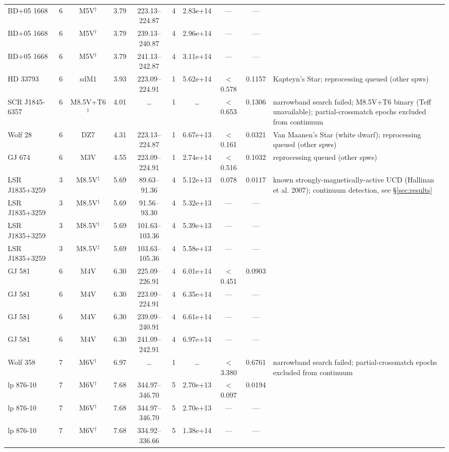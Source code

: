 \documentclass{openjournal}
\begin{document}
\begin{table}
\begin{tabularx}{\textwidth}{@{}l c c c c c c c c X@{}}
BD+05  1668 & 6 & M5V$^\dagger$ & 3.79 & 223.13--224.87 & 4 & 2.83e+14 & --- & --- &  \\
BD+05  1668 & 6 & M5V$^\dagger$ & 3.79 & 239.13--240.87 & 4 & 2.96e+14 & --- & --- &  \\
BD+05  1668 & 6 & M5V$^\dagger$ & 3.79 & 241.13--242.87 & 4 & 3.11e+14 & --- & --- &  \\
HD 33793 & 6 & sdM1 & 3.93 & 223.09--224.91 & 1 & 5.62e+14 & $<$0.578 & 0.1157 & Kapteyn's Star; reprocessing queued (other spws) \\
SCR J1845-6357 & 6 & M8.5V+T6$^\ddagger$ & 4.01 & \ldots & 1 & \ldots & $<$0.653 & 0.1306 & narrowband search failed; M8.5V+T6 binary (Teff unavailable); partial-crossmatch epochs excluded from continuum \\
Wolf   28 & 6 & DZ7 & 4.31 & 223.13--224.87 & 1 & 6.67e+13 & $<$0.161 & 0.0321 & Van Maanen's Star (white dwarf); reprocessing queued (other spws) \\
GJ 674 & 6 & M3V & 4.55 & 223.09--224.91 & 1 & 2.74e+14 & $<$0.516 & 0.1032 & reprocessing queued (other spws) \\
LSR J1835+3259 & 3 & M8.5V$^\ddagger$ & 5.69 & 89.63--91.36 & 4 & 5.12e+13 & 0.078 & 0.0117 & known strongly-magnetically-active UCD (Hallinan et al. 2007); continuum detection, see \S\ref{sec:results} \\
LSR J1835+3259 & 3 & M8.5V$^\ddagger$ & 5.69 & 91.56--93.30 & 4 & 5.32e+13 & --- & --- &  \\
LSR J1835+3259 & 3 & M8.5V$^\ddagger$ & 5.69 & 101.63--103.36 & 4 & 5.39e+13 & --- & --- &  \\
LSR J1835+3259 & 3 & M8.5V$^\ddagger$ & 5.69 & 103.63--105.36 & 4 & 5.58e+13 & --- & --- &  \\
GJ 581 & 6 & M4V & 6.30 & 225.09--226.91 & 4 & 6.01e+14 & $<$0.451 & 0.0903 &  \\
GJ 581 & 6 & M4V & 6.30 & 223.09--224.91 & 4 & 6.35e+14 & --- & --- &  \\
GJ 581 & 6 & M4V & 6.30 & 239.09--240.91 & 4 & 6.61e+14 & --- & --- &  \\
GJ 581 & 6 & M4V & 6.30 & 241.09--242.91 & 4 & 6.97e+14 & --- & --- &  \\
Wolf  358 & 7 & M6V$^\dagger$ & 6.97 & \ldots & 1 & \ldots & $<$3.380 & 0.6761 & narrowband search failed; partial-crossmatch epochs excluded from continuum \\
lp 876-10 & 7 & M6V$^\dagger$ & 7.68 & 344.97--346.70 & 5 & 2.70e+13 & $<$0.097 & 0.0194 &  \\
lp 876-10 & 7 & M6V$^\dagger$ & 7.68 & 344.97--346.70 & 5 & 2.70e+13 & --- & --- &  \\
lp 876-10 & 7 & M6V$^\dagger$ & 7.68 & 334.92--336.66 & 5 & 1.38e+14 & --- & --- &  \\
\hline
\end{tabularx}
\end{table}
\end{document}
